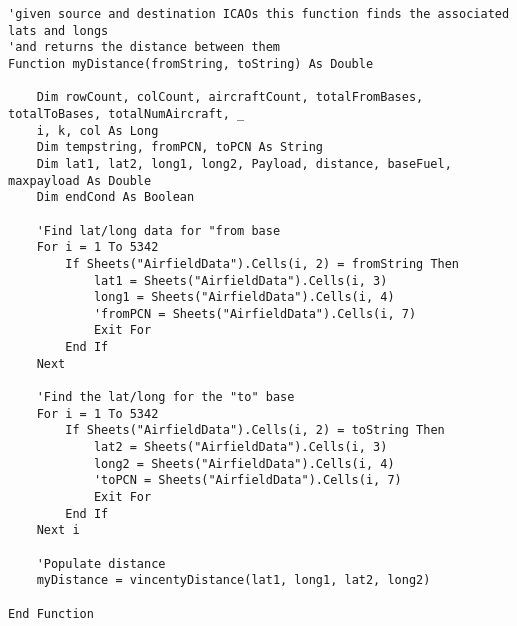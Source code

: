 \begin{lstlisting}
'given source and destination ICAOs this function finds the associated lats and longs
'and returns the distance between them
Function myDistance(fromString, toString) As Double

    Dim rowCount, colCount, aircraftCount, totalFromBases, totalToBases, totalNumAircraft, _
    i, k, col As Long
    Dim tempstring, fromPCN, toPCN As String
    Dim lat1, lat2, long1, long2, Payload, distance, baseFuel, maxpayload As Double
    Dim endCond As Boolean
    
    'Find lat/long data for "from base
    For i = 1 To 5342
        If Sheets("AirfieldData").Cells(i, 2) = fromString Then
            lat1 = Sheets("AirfieldData").Cells(i, 3)
            long1 = Sheets("AirfieldData").Cells(i, 4)
            'fromPCN = Sheets("AirfieldData").Cells(i, 7)
            Exit For
        End If
    Next
        
    'Find the lat/long for the "to" base
    For i = 1 To 5342
        If Sheets("AirfieldData").Cells(i, 2) = toString Then
            lat2 = Sheets("AirfieldData").Cells(i, 3)
            long2 = Sheets("AirfieldData").Cells(i, 4)
            'toPCN = Sheets("AirfieldData").Cells(i, 7)
            Exit For
        End If
    Next i
    
    'Populate distance
    myDistance = vincentyDistance(lat1, long1, lat2, long2)
                     
End Function
\end{lstlisting}
 \label{code_preprocessing}
